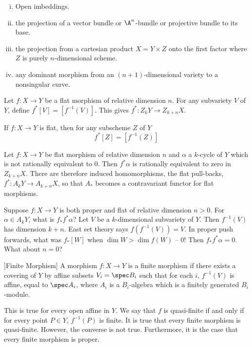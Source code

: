 \begin{ex}
\begin{enumerate}[(i)]
\item Open imbeddings.
\item the projection of a vector bundle or $\A^n$-bundle or projective bundle to its base.
\item the projection from a cartesian product $X=Y \times Z$ onto the first factor where $Z$ is purely $n$-dimensional scheme.
\item any dominant morphism from an $(n+1)$-dimensional variety to a nonsingular curve.
\end{enumerate}
\end{ex}

Let $f: X \to Y$ be a flat morphism of relative dimension $n$. For any subvariety $V$ of $Y$, define $f^*[V]= [f^{-1}(V)]$. This gives $f^*: Z_kY \to Z_{k+n} X$. 

\begin{lem}
If $f: X \to Y$ is flat, then for any subscheme $Z$ of $Y$
	\[
	f^*[Z] = [f^{-1}(Z)]
	\]
\end{lem}


\begin{thmm}
Let $f: X \to Y$ be flat morphism of relative dimension $n$ and $\alpha$ a $k$-cycle of $Y$ which is not rationally equivalent to 0. Then $f^* \alpha$ is rationally equivalent to zero in $Z_{k+n}X$. There are therefore induced homomorphisms, the flat pull-backs, $f^*: A_k Y \to A_{k+n}X$, so that $A_*$ becomes a contravariant functor for flat morphisms. 
\end{thmm}

Suppose $f: X \to Y$ is both proper and flat of relative dimension $n>0$. For $\alpha \in A_kY$, what is $f_*f^*\alpha$? Let $V$ be a $k$-dimensional subvariety of $Y$. Then $f^{-1}(V)$ has dimension $k+n$. East set theory says $f(f^{-1}(V))=V$. In proper push forwards, what was $f_*[W]$ when $\dim W >\dim f(W)$ -- 0! Then $f_*f^*\alpha =0$. What about $n=0$? 

\begin{dfn}]Finite Morphism]
A morphism $f: X \to Y$ is a finite morphism if there exists a covering of $Y$ by affine subsets $V_i = \spec B_i$ such that for each $i$, $f^{-1}(V)$ is affine, equal to $\spec A_i$, where $A_i$ is a $B_i$-algebra which is a finitely generated $B_i$-module.
\end{dfn}

This is true for every open affine in $Y$. We say that $f$ is quasi-finite if and only if for every point $P \in Y$, $f^{-1}(P)$ is finite. It is true that every finite morphism is quasi-finite. However, the converse is not true. Furthermore, it is the case that every finite morphism is proper. 

